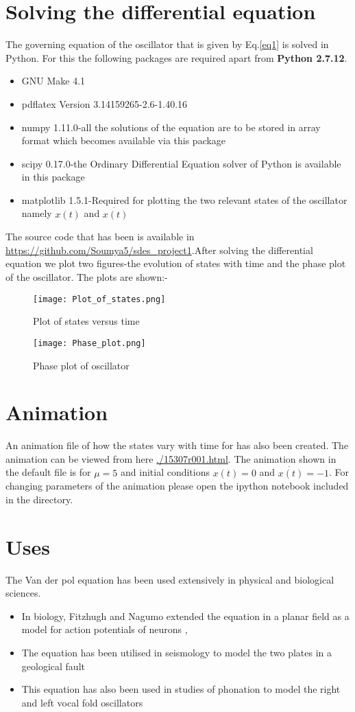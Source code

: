 \documentclass[a4paper]{article}
\begin{document}
\section{Solving the differential equation}
The governing equation of the oscillator that is given by Eq.\ref{eq1} is solved in Python. For this the following packages are required 
apart from \textbf{Python 2.7.12}.
\begin{itemize}
    \item{GNU Make 4.1}
    \item{pdflatex Version 3.14159265-2.6-1.40.16} 
    \item{numpy 1.11.0}-all the solutions of the equation are to be stored in array format which becomes available via this package
    \item{scipy 0.17.0}-the Ordinary Differential Equation solver of Python is available in this package
    \item{matplotlib 1.5.1}-Required for plotting the two relevant states of the oscillator namely $x(t)$ and $\dot{x(t)}$
\end{itemize}
The source code that has been is available in \url{https://github.com/Soumya5/sdes_project1}.After solving the differential equation we plot two figures-the evolution of states with time and the phase plot of the oscillator. The plots are shown:-
\begin{figure}[H]
    \centering
    \texttt{[image: Plot\_of\_states.png]}
    \caption{Plot of states versus time}
\end{figure}
\begin{figure}[H]
    \centering
    \texttt{[image: Phase\_plot.png]}
    \caption{Phase plot of oscillator}
\end{figure}
\section{Animation}
An animation file of how the states vary with time for has also been created. The animation can be viewed from here \url{./15307r001.html}.
The animation shown in the default file is for $\mu=5$ and initial conditions $x(t)=0$ and $\dot{x(t)}=-1$. For changing parameters of the
animation please open the ipython notebook included in the directory.
\section{Uses}
The Van der pol equation has been used extensively in physical and biological sciences.
\begin{itemize}
    \item In biology, Fitzhugh and Nagumo extended the equation in a planar field as a model for action potentials of neurons \cite{fitz}, \cite{nagumo1962}
    \item The equation has been utilised in seismology to model the two plates in a geological fault \cite{seis}
    \item This equation has also been used in studies of phonation to model the right and left vocal fold oscillators \cite{phonation}
\end{itemize}
{}

\end{document}
